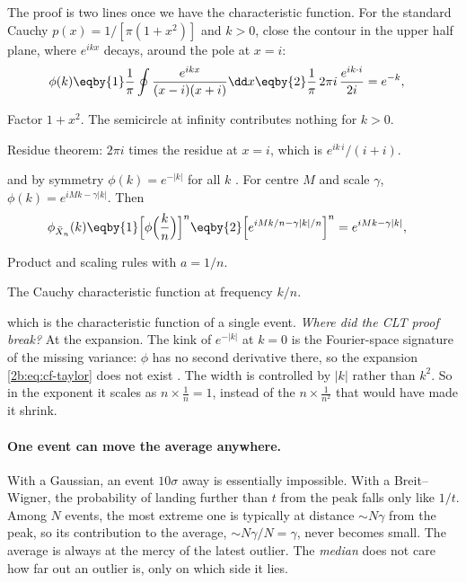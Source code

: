 The proof is two lines once we have the characteristic function. For the standard Cauchy $p(x)=1/[\pi(1+x^2)]$ and $k>0$, close the contour in the upper half plane, where $e^{ikx}$ decays, around the pole at $x=i$:
\begin{align}
  \phi(k)
  &\eqby{1} \frac1\pi\oint\frac{e^{ikx}}{(x-i)(x+i)}\dd x
  \eqby{2} \frac1\pi\,2\pi i\,\frac{e^{ik\cdot i}}{2i}
  = e^{-k} ,
  \label{2b:eq:cf-cauchy}
\end{align}
\begin{explain}
  \item Factor $1+x^2$. The semicircle at infinity contributes nothing for $k>0$.
  \item Residue theorem: $2\pi i$ times the residue at $x=i$, which is $e^{ik\,i}/(i+i)$.
\end{explain}
and by symmetry $\phi(k)=e^{-|k|}$ for all $k$ . For centre $M$ and scale $\gamma$, $\phi(k)=e^{iMk-\gamma|k|}$. Then
\begin{align}
  \phi_{\bar X_n}(k)
  &\eqby{1}\Bigl[\phi\Bigl(\frac kn\Bigr)\Bigr]^n
  \eqby{2}\Bigl[e^{iMk/n-\gamma|k|/n}\Bigr]^n
  = e^{iMk-\gamma|k|} ,
  \label{2b:eq:cauchy-mean}
\end{align}
\begin{explain}
  \item Product and scaling rules with $a=1/n$.
  \item The Cauchy characteristic function at frequency $k/n$.
\end{explain}
which is the characteristic function of a single event. \emph{Where did the CLT proof break?} At the expansion. The kink of $e^{-|k|}$ at $k=0$ is the Fourier-space signature of the missing variance: $\phi$ has no second derivative there, so the expansion \eqref{2b:eq:cf-taylor} does not exist . The width is controlled by $|k|$ rather than $k^2$. So in the exponent it scales as $n\times\frac1n=1$, instead of the $n\times\frac1{n^2}$ that would have made it shrink.

\paragraph{One event can move the average anywhere.}
With a Gaussian, an event $10\sigma$ away is essentially impossible. With a Breit--Wigner, the probability of landing further than $t$ from the peak falls only like $1/t$. Among $N$ events, the most extreme one is typically at distance $\sim N\gamma$ from the peak, so its contribution to the average, $\sim N\gamma/N=\gamma$, never becomes small. The average is always at the mercy of the latest outlier. The \emph{median} does not care how far out an outlier is, only on which side it lies.

